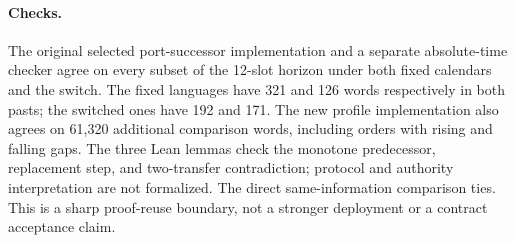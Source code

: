 \documentclass[11pt]{article}
\begin{document}
\paragraph{Checks.}
The original selected port-successor implementation and a separate absolute-time checker agree on every subset of the 12-slot horizon under both fixed calendars and the switch. The fixed languages have 321 and 126 words respectively in both pasts; the switched ones have 192 and 171. The new profile implementation also agrees on 61,320 additional comparison words, including orders with rising and falling gaps. The three Lean lemmas check the monotone predecessor, replacement step, and two-transfer contradiction; protocol and authority interpretation are not formalized. The direct same-information comparison ties. This is a sharp proof-reuse boundary, not a stronger deployment or a contract acceptance claim.
\end{document}
